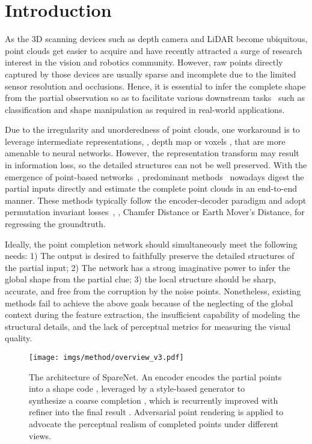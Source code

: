 \documentclass[final]{cvpr}
\begin{document}
\section{Introduction}

As the 3D scanning devices such as depth camera and LiDAR become ubiquitous, point clouds get easier to acquire and have recently attracted a surge of research interest in the vision and robotics community. 
However, raw points directly captured by those devices are usually sparse and incomplete due to the limited sensor resolution and occlusions. Hence, it is essential to infer the complete shape from the partial observation so as to facilitate various downstream tasks~\cite{guo2020deep} such as classification and shape manipulation as required in real-world applications.

Due to the irregularity and unorderedness of point clouds, one workaround is to leverage intermediate representations, \eg, depth map \cite{hu2019render4completion} or voxels \cite{xie2020grnet}, that are more amenable to neural networks. However, the representation transform may result in information loss, so the detailed structures can not be well preserved. With the emergence of point-based networks~\cite{qi2017pointnet,qi2017pointnet++,thomas2019kpconv,dgcnn,guo2020deep}, predominant methods~\cite{foldingnet_2018_CVPR,Yuan-2018-pcn,atlasnet2018,wen2020point,liu2019morphing,topnet_2019_CVPR,chen2019unpaired,cascaded_2020_CVPR, pfnet_2020_CVPR, detailpreserved_eccv2020} nowadays digest the partial inputs directly and estimate the complete point clouds in an end-to-end manner. These methods typically follow the encoder-decoder paradigm and adopt permutation invariant losses~\cite{fan2017pointsetgeneration}, \eg, Chamfer Distance or Earth Mover's Distance, for regressing the groundtruth. 

Ideally, the point completion network should simultaneously meet the following needs: 1) The output is desired to faithfully preserve the detailed structures of the partial input; 2) The network has a strong imaginative power to infer the global shape from the partial clue; 3) the local structure should be sharp, accurate, and free from the corruption by the noise points. Nonetheless, existing methods fail to achieve the above goals because of the neglecting of the global context during the feature extraction, the insufficient capability of modeling the structural details, and the lack of perceptual metrics for measuring the visual quality. 


\begin{figure*}[t]
\centering
 \texttt{[image: imgs/method/overview\_v3.pdf]}
 \footnotesize
    \caption{
    The architecture of SpareNet. An encoder  encodes the partial points  into a shape code , leveraged by a style-based generator  to synthesize a coarse completion , which is recurrently improved with refiner  into the final result . Adversarial point rendering is applied to advocate the perceptual realism of completed points under different views.
    }
\label{fig:overview}
\vspace{-1em}
\end{figure*}
\end{document}
